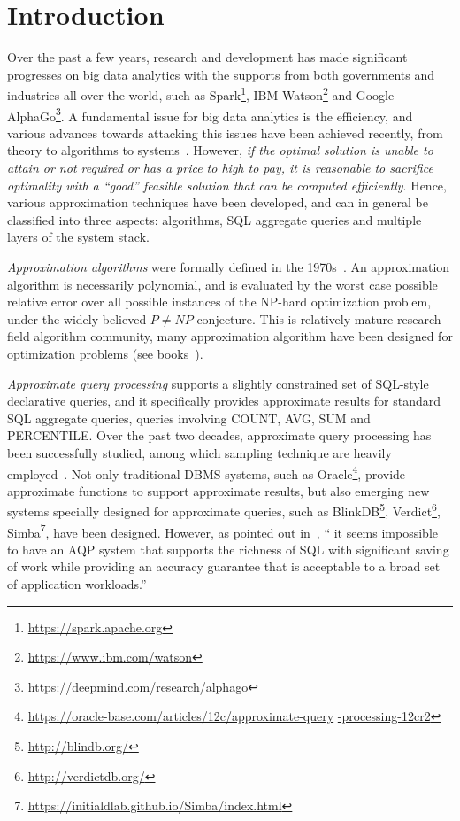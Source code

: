 \section{Introduction}
\label{sec-intro}


Over the past a few years, research and development has made significant progresses on big data analytics with the supports from both governments and industries all over the world, such as Spark\footnote{\small \url{https://spark.apache.org}}, IBM Watson\footnote{\small \url{https://www.ibm.com/watson}} and Google AlphaGo\footnote{\small \url{https://deepmind.com/research/alphago}}. A fundamental issue for big data analytics is the efficiency, and various advances towards attacking this issues have been achieved recently, from theory to algorithms to systems~\cite{FanGN13,Jordan15,ZahariaXWDADMRV16}. However, {\em if the optimal solution is unable to attain or not required or has a price to high to pay, it is reasonable to sacrifice optimality with a ``good'' feasible solution that can be computed efficiently}. Hence, various approximation techniques have been developed, and can in general be classified into three aspects: algorithms, SQL aggregate queries and multiple layers of the system stack.

\bi
\item[(1)] {\em Approximation algorithms} were formally defined in the 1970s~\cite{GareyGU72,Johnson74a}. An approximation algorithm is necessarily polynomial, and is evaluated by the worst case possible relative error over all possible instances of the  NP-hard optimization problem, under the widely believed $P\ne NP$ conjecture. This is relatively mature research field algorithm community, many approximation algorithm have been designed for optimization problems (see books~\cite{Dorit96,approx03,Ausiello99}).
\item[(2)] {\em Approximate query processing} supports a slightly constrained set of SQL-style declarative queries, and it specifically provides approximate results for standard SQL aggregate queries, \eg queries involving COUNT, AVG, SUM and PERCENTILE. Over the past two decades, approximate query processing has been successfully studied, among which sampling technique are heavily employed~\cite{ChaudhuriDK17,Mozafari17,Kraska17,GarofalakisG01}. Not only traditional DBMS systems, such as Oracle\footnote{\small \url{https://oracle-base.com/articles/12c/approximate-query} \url{-processing-12cr2}},  provide approximate functions to support approximate results, but also emerging new systems specially designed for approximate queries, such as BlinkDB\footnote{\small \url{http://blindb.org/}}, Verdict\footnote{\small \url{http://verdictdb.org/}}, Simba\footnote{\small \url{https://initialdlab.github.io/Simba/index.html}}, have been designed. However, as pointed out in~\cite{ChaudhuriDK17}, `` it seems impossible to have an AQP system that supports the richness of SQL with significant saving of work while providing an accuracy guarantee that is acceptable to a broad set of application workloads.''

